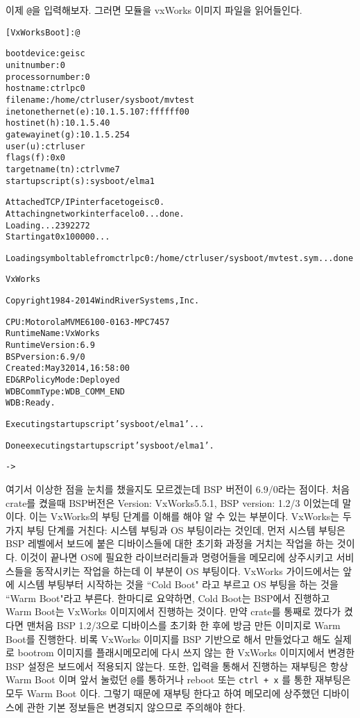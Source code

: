 \documentclass[11pt,a4paper]{article}
\begin{document}
이제 \verb|@|을 입력해보자. 그러면 모듈을 vxWorks 이미지 파일을 읽어들인다.
\begin{framed}
\begin{alltt}
[VxWorks Boot]: @

boot device          : geisc
unit number          : 0 
processor number     : 0 
host name            : ctrlpc0
file name            : /home/ctrluser/sysboot/mvtest
inet on ethernet (e) : 10.1.5.107:ffffff00
host inet (h)        : 10.1.5.40
gateway inet (g)     : 10.1.5.254
user (u)             : ctrluser
flags (f)            : 0x0 
target name (tn)     : ctrlvme7
startup script (s)   : sysboot/elma1

Attached TCP/IP interface to geisc0.
Attaching network interface lo0... done.
Loading... 2392272
Starting at 0x100000...

Loading symbol table from ctrlpc0:/home/ctrluser/sysboot/mvtest.sym ...done


                VxWorks

Copyright 1984-2014  Wind River Systems, Inc.

             CPU: Motorola MVME6100-0163 - MPC 7457
    Runtime Name: VxWorks
 Runtime Version: 6.9
     BSP version: 6.9/0
         Created: May  3 2014, 16:58:00
ED&R Policy Mode: Deployed
   WDB Comm Type: WDB_COMM_END
             WDB: Ready.

Executing startup script 'sysboot/elma1'...

Done executing startup script 'sysboot/elma1'.

-> 
\end{alltt}
\end{framed}

여기서 이상한 점을 눈치를 챘을지도 모르겠는데 BSP 버전이 6.9/0라는 점이다. 처음 crate를 켰을때
BSP버전은 Version: VxWorks5.5.1, BSP version: 1.2/3 이었는데 말이다. 이는 VxWorks의 부팅 단계를 이해를 해야 
알 수 있는 부분이다. VxWorks는 두가지 부팅 단계를 거친다: 시스템 부팅과 OS 부팅이라는 것인데, 먼저 
시스템 부팅은 BSP 레벨에서 보드에 붙은 디바이스들에 대한 초기화 과정을 거치는 작업을 하는 것이다. 이것이 끝나면
OS에 필요한 라이브러리들과 명령어들을 메모리에 상주시키고 서비스들을 동작시키는 작업을 하는데 이 부분이 OS 부팅이다.
VxWorks 가이드에서는 앞에 시스템 부팅부터 시작하는 것을 ``Cold Boot" 라고 부르고 OS 부팅을 하는 것을 ``Warm Boot"라고 부른다.
한마디로 요약하면, Cold Boot는 BSP에서 진행하고 Warm Boot는 VxWorks 이미지에서 진행하는 것이다. 만약 crate를 통째로
껐다가 켰다면 맨처음 BSP 1.2/3으로 디바이스를 초기화 한 후에 방금 만든 이미지로 Warm Boot를 진행한다. 
비록 VxWorks 이미지를 BSP 기반으로 해서 만들었다고 해도 실제로 bootrom 이미지를 플래시메모리에 다시 쓰지 않는 한
VxWorks 이미지에서 변경한 BSP 설정은 보드에서 적용되지 않는다. 또한, 입력을 통해서 진행하는 재부팅은 항상 Warm Boot 이며 
앞서 눌렀던 \verb|@|를 통하거나 reboot 또는 \verb|ctrl + x| 를 통한 재부팅은 모두 Warm Boot 이다. 그렇기 때문에
재부팅 한다고 하여 메모리에 상주했던 디바이스에 관한 기본 정보들은 변경되지 않으므로 주의해야 한다. \\
\end{document}
